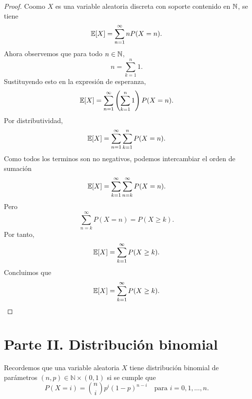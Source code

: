 \documentclass[12pt,a4paper]{article}
\newcommand{\paren}[1]{\left( #1 \right)}
\begin{document}
    \begin{proof}
        Coomo $X$ es una variable aleatoria discreta con soporte contenido en $\mathbb{N}$, se tiene
        \begin{equation*}
            \mathbb{E}[X]=\sum_{n=1}^{\infty}nP(X=n).
        \end{equation*}
        Ahora observemos que para todo $n\in\mathbb{N}$,
        \begin{equation*}
            n=\sum_{k=1}^{n}1.
        \end{equation*}
        Sustituyendo esto en la expresión de esperanza,
        \begin{equation*}
            \E[X]=\sum_{n=1}^{\infty}\paren{\sum_{k=1}^{n}1}P(X=n).
        \end{equation*}
        Por distributividad,
        \begin{equation*}
            \mathbb{E}[X]=\sum_{n=1}^{\infty}\sum_{k=1}^{n}P(X=n).
        \end{equation*}
        Como todos los terminos son no negativos, podemos intercambiar el orden de sumación
        \begin{equation*}
            \mathbb{E}[X]=\sum_{k=1}^{\infty}\sum_{n=k}^{\infty}P(X=n).
        \end{equation*}
        Pero
        \begin{equation*}
            \sum_{n=k}^{\infty}P(X=n)=P(X\geq k).
        \end{equation*}
        Por tanto,
        \begin{equation*}
            \mathbb{E}[X]=\sum_{k=1}^{\infty}P(X\geq k).
        \end{equation*}
        Concluimos que
        \begin{equation*}
            \mathbb{E}[X]=\sum_{k=1}^{\infty}P(X\geq k).
        \end{equation*}
    \end{proof}

    \section*{Parte II. Distribución binomial}

    Recordemos que una variable aleatoria $X$ tiene distribución binomial de parámetros
    $(n, p) \in \mathbb{N} \times (0,1)$ si se cumple que
    \begin{equation*}
        P(X = i) = \binom{n}{i} p^i (1-p)^{n-i} \quad \text{para } i = 0, 1, \ldots, n.
    \end{equation*}
\end{document}
